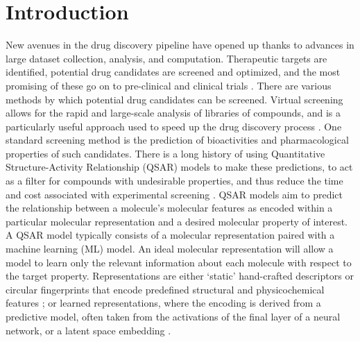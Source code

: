 \chapter{Introduction}\label{chap:intro}

New avenues in the drug discovery pipeline have opened up thanks to advances in large dataset collection, analysis, and computation. Therapeutic targets are identified, potential drug candidates are screened and optimized, and the most promising of these go on to pre-clinical and clinical trials \citep{Lill2007}. There are various methods by which potential drug candidates can be screened. Virtual screening allows for the rapid and large-scale analysis of libraries of compounds, and is a particularly useful approach used to speed up the drug discovery process \citep{Neves2018}. One standard screening method is the prediction of bioactivities and pharmacological properties of such candidates. There is a long history of using Quantitative Structure-Activity Relationship (QSAR) models to make these predictions, to act as a filter for compounds with undesirable properties, and thus reduce the time and cost associated with experimental screening \citep{Sabando2021}. QSAR models aim to predict the relationship between a molecule's molecular features as encoded within a particular molecular representation and a desired molecular property \citep{Sabando2021} of interest. A QSAR model typically consists of a molecular representation paired with a machine learning (ML) model. An ideal molecular representation will allow a model to learn only the relevant information about each molecule with respect to the target property. Representations are either `static' hand-crafted descriptors or circular fingerprints that encode predefined structural and physicochemical features \citep{rogers2010, David2020, sns, avalon}; or learned representations, where the encoding is derived from a predictive model, often taken from the activations of the final layer of a neural network, or a latent space embedding \citep{Sabando2021, kishimoto2023}. 

